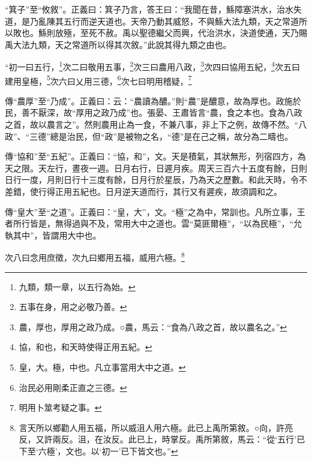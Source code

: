 {\noindent\shu{}\fzkt “箕子”至“攸敘”。正義曰：箕子乃言，答王曰：“我聞在昔，鯀障塞洪水，治水失道，是乃亂陳其五行而逆天道也。天帝乃動其威怒，不與鯀大法九類，天之常道所以敗也。鯀則放殛，至死不赦。禹以聖德繼父而興，代治洪水，決道使通，天乃賜禹大法九類，天之常道所以得其次敘。”此說其得九類之由也。 \par}

“初一曰五行，\footnote{九類，類一章，以五行為始。}次二曰敬用五事，\footnote{五事在身，用之必敬乃善。}次三曰農用八政，\footnote{農，厚也，厚用之政乃成。○農，馬云：“食為八政之首，故以農名之。”}次四曰協用五紀，\footnote{協，和也，和天時使得正用五紀。}次五曰建用皇極，\footnote{皇，大。極，中也。凡立事當用大中之道。}次六曰乂用三德，\footnote{治民必用剛柔正直之三德。}次七曰明用稽疑，\footnote{明用卜筮考疑之事。}


{\noindent\zhuan{}\fzbyks 傳“農厚”至“乃成”。正義曰：云：“農讀為醲。”則“農”是醲意，故為厚也。政施於民，善不厭深，故“厚用之政乃成”也。張晏、王肅皆言“農，食之本也。食為八政之首，故以農言之”。然則農用止為一食，不兼八事，非上下之例，故傳不然。“八政”、“三德”總是治民，但“政”是被物之名，“德”是在己之稱，故分為二疇也。 \par}

{\noindent\zhuan{}\fzbyks 傳“協和”至“五紀”。正義曰：“協，和”，文。天是積氣，其狀無形，列宿四方，為天之限。天左行，晝夜一週。日月右行，日遲月疾。周天三百六十五度有餘，日則日行一度，月則日行十三度有餘，日月行於星辰，乃為天之歷數。和此天時，令不差錯，使行得正用五紀也。日月逆天道而行，其行又有遲疾，故須調和之。 \par}

{\noindent\zhuan{}\fzbyks 傳“皇大”至“之道”。正義曰：“皇，大”，文。“極”之為中，常訓也。凡所立事，王者所行皆是，無得過與不及，常用大中之道也。雲“莫匪爾極”，“以為民極”，“允執其中”，皆謂用大中也。 \par}

次八曰念用庶徵，次九曰鄉用五福，威用六極。\footnote{言天所以鄉勸人用五福，所以威沮人用六極。此已上禹所第敘。○向，許亮反，又許兩反。沮，在汝反。此已上，時掌反。禹所第敘，馬云：“從‘五行’已下至‘六極’，文也。以‘初一’已下皆文也。”}

